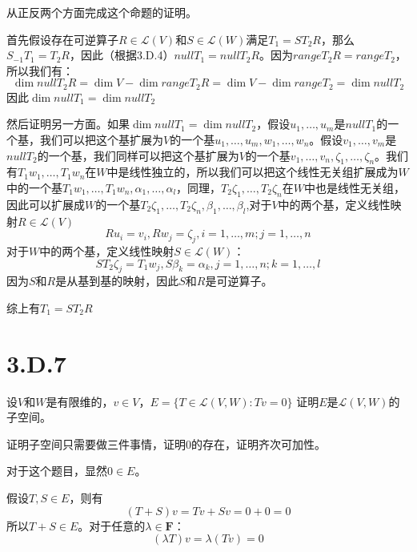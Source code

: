 \documentclass[10pt,a4paper,UTF8]{article}
\begin{document}
\begin{answer}
从正反两个方面完成这个命题的证明。

首先假设存在可逆算子\(R\in \mathcal{L}(V)\)和\(S\in \mathcal{L}(W)\)满足\(T_{1}=ST_{2}R\)，那么\(S_{-1}T_{1} = T_{2}R\)，因此（根据3.D.4）\(nullT_{1} = nullT_{2}R\)。因为\(rangeT_{2}R = rangeT_{2}\)，所以我们有：
\begin{equation}
\label{eq:18}
\dim nullT_{2}R = \dim V - \dim rangeT_{2}R = \dim V - \dim rangeT_{2} = \dim nullT_{2}
\end{equation}
因此\(\dim nullT_{1} = \dim nullT_{2}\)

然后证明另一方面。如果\(\dim nullT_{1} = \dim nullT_{2}\)，假设\(u_{1},\ldots ,u_{m}\)是\(nullT_{1}\)的一个基，我们可以把这个基扩展为\(V\)的一个基\(u_{1},\ldots ,u_{m},w_{1},\ldots ,w_{n}\)。假设\(v_{1},\ldots ,v_{m}\)是\(nullT_{2}\)的一个基，我们同样可以把这个基扩展为\(V\)的一个基\(v_{1},\ldots ,v_{n},\zeta_{1},\ldots ,\zeta_{n}\)。我们有\(T_{1}w_{1},\ldots ,T_{1}w_{n}\)在\(W\)中是线性独立的，所以我们可以把这个线性无关组扩展成为\(W\)中的一个基\(T_{1}w_{1},\ldots ,T_{1}w_{n},\alpha_{1},\ldots ,\alpha_{l}\)，同理，\(T_{2}\zeta_{1},\ldots ,T_{2}\zeta_{n}\)在\(W\)中也是线性无关组，因此可以扩展成\(W\)的一个基\(T_{2}\zeta_{1},\ldots ,T_{2}\zeta_{n},\beta_{1},\ldots ,\beta_{l}\),对于\(V\)中的两个基，定义线性映射\(R\in \mathcal{L}(V)\)
\begin{equation}
\label{eq:19}
Ru_{i}= v_{i},Rw_{j} = \zeta_{j}, i = 1,\ldots ,m;j=1,\ldots ,n
\end{equation}
对于\(W\)中的两个基，定义线性映射\(S\in \mathcal{L}(W)\)：
\begin{equation}
\label{eq:20}
ST_{2}\zeta_{j} = T_{1}w_{j},S\beta_{k} = \alpha_{k},j=1,\ldots ,n;k=1,\ldots ,l
\end{equation}
因为\(S\)和\(R\)是从基到基的映射，因此\(S\)和\(R\)是可逆算子。

综上有\(T_{1} = ST_{2}R\)
\end{answer}
\section{3.D.7}
\label{sec:orgb3cda27}


\begin{problem}
设\(V\)和\(W\)是有限维的，\(v\in V\)，\(E = \{T\in \mathcal{L}(V,W):Tv = 0\}\)
 证明\(E\)是\(\mathcal{L}(V,W)\)的子空间。
\end{problem}

\begin{answer}
证明子空间只需要做三件事情，证明\(0\)的存在，证明齐次可加性。

对于这个题目，显然\(0\in E\)。

假设\(T,S\in E\)，则有
\begin{equation}
\label{eq:21}
(T+S)v = Tv + Sv = 0 + 0 = 0
\end{equation}
所以\(T+S \in E\)。对于任意的\(\lambda \in \mathbf{F}\)：
\begin{equation}
\label{eq:22}
(\lambda T)v = \lambda(Tv) =0
\end{equation}
\end{answer}
\end{document}
